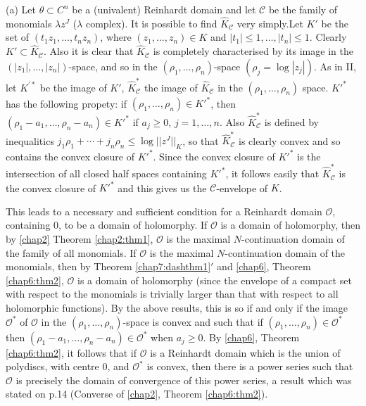 \begin{examples*}
(a) Let $\theta \subset C^n$ be a (univalent) Reinhardt domain and let
  $\mathscr{C}$ be the family of monomials $\lambda z^J$ ($\lambda$
  complex). It is possible to find $\hat{K}_{\mathscr{C}}$ very
  simply.\pageoriginale Let $K'$ be the set of $(t_1 z_1, \ldots, t_n
  z_n)$, where $(z_1, \ldots, z_n) \in K$ and $|t_1| \leq 1, \ldots,
  |t_n| \leq 1$. Clearly $K' \subset \hat{K}_\mathscr{C}$. Also it is
  clear that $\hat{K}_\mathscr{C}$ is completely characterised by its
  image in the  $(|z_1|, \ldots, |z_n|)$-space, and so in the
  $(\rho_1, \ldots, \rho_n)$-space $(\rho_j = \log |z_j|)$. As in II,
  let $K^{'\ast}$ be the image of $K'$, $\hat{K}^\ast_{\mathscr{C}}$
  the image of $\hat{K}_{\mathscr{C}}$ in the $(\rho_1, \ldots,
  \rho_n)$ space. $K'^\ast$ has the following propety: if $(\rho_1,
  \ldots, \rho_n) \in K'^\ast$, then $(\rho_1 -a_1, \ldots, \rho_n -
  a_n) \in K'^\ast$ if $a_j \geq 0$, $j = 1, \ldots, n$. Also
  $\hat{K}^\ast_{\mathscr{C}}$ is defined by inequalitics $j_1 \rho_1
  + \cdots + j_n \rho_n \leq \log|| z^J||_K$, so that
  $\hat{K}^\ast_{\mathscr{C}}$ is clearly convex and so contains the
  convex closure of $K'^\ast$. Since the convex closure of $K'^\ast$
  is the intersection of all closed half spaces containing $K'^\ast$,
  it follows easily that $\hat{K}^\ast_{\mathscr{C}}$ is the convex
  closure of $K'^\ast$ and this gives us the $\mathscr{C}$-envelope of
  $K$. 

This leads to a necessary and sufficient condition for a Reinhardt
domain $\mathscr{O}$, containing $0$, to be a domain of holomorphy. If
$\mathscr{O}$ is a domain of holomorphy, then by \ref{chap2} Theorem
\ref{chap2:thm1}, 
$\mathscr{O}$ is the maximal $N$-continuation domain of the family of
all monomials. If $\mathscr{O}$ is the maximal $N$-continuation domain
of the monomials, then by Theorem \ref{chap7:dashthm1}$'$ and
\ref{chap6}, Theorem \ref{chap6:thm2}, 
$\mathscr{O}$ is a domain of holomorphy (since the envelope of a
compact set with respect to the monomials is trivially larger than
that with respect to all holomorphic functions). By the above results,
this is so if and only if the image $\mathscr{O}^\ast$ of
$\mathscr{O}$ in the $(\rho_1, \ldots, \rho_n)$-space is convex and
such that if $(\rho_1, \ldots , \rho_n) \in \mathscr{O}^\ast$ then
$(\rho_1 - a_1, \ldots, \rho_n - a_n) \in\mathscr{O}^\ast$ when $a_j
\geq 0$. By \ref{chap6}, Theorem \ref{chap6:thm2}, it follows that if
$\mathscr{O}$ is a 
Reinhardt domain which is the union of polydiscs, with centre $0$, and
$\mathscr{O}^\ast$ is convex, then there is a power series such that
$\mathscr{O}$ is precisely the domain of convergence of this power
series, a result which was stated on p.14 (Converse of \ref{chap2}, Theorem
\ref{chap6:thm2}). 


\end{examples*}
